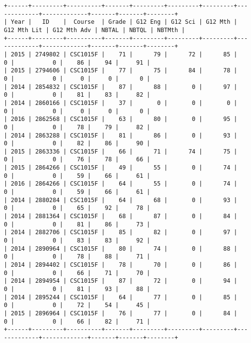 \begin{sidewaysfigure}
    \centering
    \begin{mdframed}[rightline=false,topline=false,leftline=false]
        \centering
        \begin{BVerbatim}
+------+---------+----------+-------+---------+---------+---------+-------------+-------------+-------+-------+--------+
| Year |   ID    |  Course  | Grade | G12 Eng | G12 Sci | G12 Mth | G12 Mth Lit | G12 Mth Adv | NBTAL | NBTQL | NBTMth |
+------+---------+----------+-------+---------+---------+---------+-------------+-------------+-------+-------+--------+
| 2015 | 2749802 | CSC1015F |    71 |      79 |      72 |      85 |           0 |           0 |    86 |    94 |     91 |
| 2015 | 2794606 | CSC1015F |    77 |      75 |      84 |      78 |           0 |           0 |     0 |     0 |      0 |
| 2014 | 2854832 | CSC1015F |    87 |      88 |       0 |      97 |           0 |           0 |    81 |    83 |     82 |
| 2014 | 2860166 | CSC1015F |    37 |       0 |       0 |       0 |           0 |           0 |     0 |     0 |      0 |
| 2016 | 2862568 | CSC1015F |    63 |      80 |       0 |      95 |           0 |           0 |    78 |    79 |     82 |
| 2014 | 2863288 | CSC1015F |    81 |      86 |       0 |      93 |           0 |           0 |    82 |    86 |     90 |
| 2015 | 2863336 | CSC1015F |    66 |      71 |      74 |      75 |           0 |           0 |    76 |    78 |     66 |
| 2015 | 2864266 | CSC1015F |    49 |      55 |       0 |      74 |           0 |           0 |    59 |    66 |     61 |
| 2016 | 2864266 | CSC1015F |    64 |      55 |       0 |      74 |           0 |           0 |    59 |    66 |     61 |
| 2014 | 2880284 | CSC1015F |    64 |      68 |       0 |      93 |           0 |           0 |    65 |    92 |     78 |
| 2014 | 2881364 | CSC1015F |    68 |      87 |       0 |      84 |           0 |           0 |    81 |    86 |     73 |
| 2014 | 2882706 | CSC1015F |    85 |      82 |       0 |      97 |           0 |           0 |    83 |    83 |     92 |
| 2014 | 2890964 | CSC1015F |    80 |      74 |       0 |      88 |           0 |           0 |    78 |    88 |     71 |
| 2014 | 2894402 | CSC1015F |    78 |      70 |       0 |      86 |           0 |           0 |    66 |    71 |     70 |
| 2014 | 2894954 | CSC1015F |    87 |      72 |       0 |      94 |           0 |           0 |    81 |    93 |     88 |
| 2014 | 2895244 | CSC1015F |    64 |      77 |       0 |      85 |           0 |           0 |    72 |    54 |     45 |
| 2015 | 2896964 | CSC1015F |    76 |      77 |       0 |      84 |           0 |           0 |    66 |    82 |     71 |
+------+---------+----------+-------+---------+---------+---------+-------------+-------------+-------+-------+--------+
        \end{BVerbatim}
    \end{mdframed}
    \caption[Sample of 2-way CSV output]{\textbf{Figure \ref{fig-2-way-csv-output}: Sample of 2-way join CSV output}}
    \label{fig-2-way-csv-output}
\end{sidewaysfigure}

